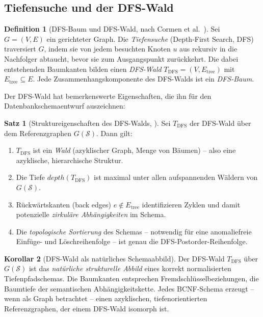 ﻿\documentclass[12pt,a4paper]{article}
\theoremstyle{definition}
\newtheorem{definition}{Definition}[section]
\newtheorem{theorem}{Satz}[section]
\newtheorem{corollary}[theorem]{Korollar}
\theoremstyle{remark}
\newcommand{\depth}{\mathit{depth}}
\begin{document}
\subsection{Tiefensuche und der DFS-Wald}

\begin{definition}[DFS-Baum und DFS-Wald, nach Cormen et al.~\cite{Cormen2009}]
\label{def:dfswald}
Sei $G = (V, E)$ ein gerichteter Graph. Die \emph{Tiefensuche} (Depth-First
Search, DFS) traversiert $G$, indem sie von jedem besuchten Knoten $u$ aus
rekursiv in die Nachfolger abtaucht, bevor sie zum Ausgangspunkt zurückkehrt.
Die dabei entstehenden Baumkanten bilden einen \emph{DFS-Wald}
$T_{\mathrm{DFS}} = (V, E_{\mathrm{tree}})$ mit
$E_{\mathrm{tree}} \subseteq E$. Jede Zusammenhangskomponente des DFS-Walds
ist ein \emph{DFS-Baum}.
\end{definition}

Der DFS-Wald hat bemerkenswerte Eigenschaften, die ihn für den
Datenbankschemaentwurf auszeichnen:

\begin{theorem}[Struktureigenschaften des DFS-Walds, \cite{Cormen2009, Tarjan1972}]
\label{thm:dfswald}
Sei $T_{\mathrm{DFS}}$ der DFS-Wald über dem Referenzgraphen
$G(\mathcal{S})$. Dann gilt:
\begin{enumerate}[label=(\roman*)]
  \item $T_{\mathrm{DFS}}$ ist ein \emph{Wald} (azyklischer Graph, Menge
        von Bäumen) -- also eine azyklische, hierarchische Struktur.
  \item Die Tiefe $\depth(T_{\mathrm{DFS}})$ ist maximal unter allen
        aufspannenden Wäldern von $G(\mathcal{S})$.
  \item Rückwärtskanten (back edges) $e \notin E_{\mathrm{tree}}$ identifizieren
        Zyklen und damit potenzielle \emph{zirkuläre Abhängigkeiten} im Schema.
  \item Die \emph{topologische Sortierung} des Schemas -- notwendig für
        eine anomaliefreie Einfüge- und Löschreihenfolge -- ist
        genau die DFS-Postorder-Reihenfolge.
\end{enumerate}
\end{theorem}

\begin{corollary}[DFS-Wald als natürliches Schemaabbild]
Der DFS-Wald $T_{\mathrm{DFS}}$ über $G(\mathcal{S})$ ist das
\emph{natürliche strukturelle Abbild} eines korrekt normalisierten
Tiefenpfadschemas. Die Baumkanten entsprechen Fremdschlüsselbeziehungen,
die Baumtiefe der semantischen Abhängigkeitskette.
Jedes BCNF-Schema erzeugt -- wenn als Graph betrachtet -- einen azyklischen,
tiefenorientierten Referenzgraphen, der einem DFS-Wald isomorph ist.
\end{corollary}
\end{document}
